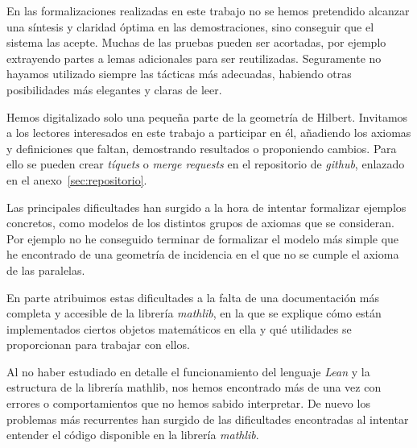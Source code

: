 En las formalizaciones realizadas en este trabajo no se hemos pretendido
alcanzar una síntesis y claridad óptima en las demostraciones, sino conseguir
que el sistema las acepte. Muchas de las pruebas pueden ser acortadas,
por ejemplo extrayendo partes a lemas adicionales para ser reutilizadas.
Seguramente no hayamos utilizado siempre las tácticas más adecuadas, habiendo
otras posibilidades más elegantes y claras de leer.

Hemos digitalizado solo una pequeña parte de la geometría de Hilbert. Invitamos
a los lectores interesados en este trabajo a participar en él, añadiendo los
axiomas y definiciones que faltan, demostrando resultados o proponiendo cambios.
Para ello se pueden crear \textit{tíquets} o \textit{merge requests} en el
repositorio de \textit{github}, enlazado en el anexo~\ref{sec:repositorio}.

Las principales dificultades han surgido a la hora de intentar formalizar
ejemplos concretos, como modelos de los distintos grupos de axiomas que se
consideran. Por ejemplo no he conseguido terminar de formalizar el modelo más
simple que he encontrado de una geometría de incidencia en el que no se cumple
el axioma de las paralelas.

En parte atribuimos estas dificultades a la falta de una documentación más
completa y accesible de la librería \textit{mathlib}, en la que se explique cómo
están implementados ciertos objetos matemáticos en ella y qué utilidades se
proporcionan para trabajar con ellos.

Al no haber estudiado en detalle el funcionamiento del lenguaje \textit{Lean} y
la estructura de la librería mathlib, nos hemos encontrado más de una vez con
errores o comportamientos que no hemos sabido interpretar. De nuevo los
problemas más recurrentes han surgido de las dificultades encontradas al
intentar entender el código disponible en la librería \textit{mathlib}.



